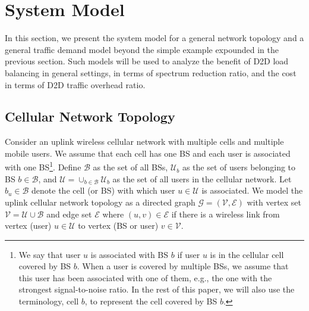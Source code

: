 \section{System Model} \label{sec:system_model}
In this section, we present the system model for a general network topology
and a general traffic demand model beyond the simple example expounded
in the previous section. Such models will be used to analyze the benefit
of D2D load balancing in general settings, in terms of spectrum
reduction ratio, and the cost in terms of D2D traffic overhead ratio.



\subsection{Cellular Network Topology} \label{sec:topology_model}
Consider an uplink wireless cellular network with multiple cells and multiple mobile users.
We assume that each cell has one BS and each user is associated with one BS\footnote{We say that user $u$ is associated with BS $b$ if user $u$ is
in the cellular cell covered by BS $b$. When a user is covered by multiple BSs,
we assume that this user has been associated with one of them, e.g., the one with the strongest signal-to-noise ratio.
In the rest of this paper,
we will also use the terminology, cell $b$, to represent the cell covered by BS $b$.}.
Define $\mathcal{B}$ as the set of all BSs,
$\mathcal{U}_b$ as the set of users belonging to BS $b \in \mathcal{B}$,
and $\mathcal{U} = \cup_{b \in \mathcal{B}} \mathcal{U}_b$ as
the set of all users in the cellular network.
Let $b_u \in \mathcal{B}$ denote the cell (or BS) with which user $u \in \mathcal{U}$ is associated.
We model the uplink cellular network topology as a directed graph
$\mathcal{G}=(\mathcal{V},\mathcal{E})$ with vertex set
$\mathcal{V} = \mathcal{U} \cup \mathcal{B}$ and edge set
$\mathcal{E}$ where $(u,v) \in \mathcal{E}$ if there is
a wireless link from vertex (user) $u \in \mathcal{U}$ to vertex (BS or user) $v \in \mathcal{V}$.


